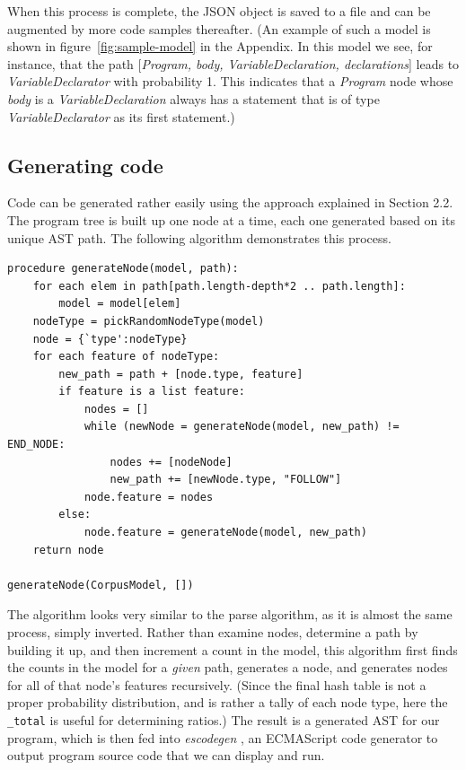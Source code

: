 \documentclass[titlepage]{article}
\begin{document}
When this process is complete, the JSON object is saved to a file and can be augmented by more code samples thereafter. (An example of such a model is shown in figure~\ref{fig:sample-model} in the Appendix. In this model we see, for instance, that the path
[\emph{Program, body, VariableDeclaration, declarations}] leads to
\emph{VariableDeclarator} with probability 1. This indicates that a \emph{Program}
node whose \emph{body} is a \emph{VariableDeclaration} always has a statement that is of
type \emph{VariableDeclarator} as its first statement.)

\subsection{Generating code}

Code can be generated rather easily using the approach explained in Section 2.2. The program tree is built up one node at a time, each one generated based on its unique AST path. The following algorithm demonstrates this process.

\clearpage

\begin{verbatim}
procedure generateNode(model, path):
    for each elem in path[path.length-depth*2 .. path.length]:
        model = model[elem]
    nodeType = pickRandomNodeType(model)
    node = {`type':nodeType}
    for each feature of nodeType:
        new_path = path + [node.type, feature]
        if feature is a list feature:
            nodes = []
            while (newNode = generateNode(model, new_path) != END_NODE:
                nodes += [nodeNode]
                new_path += [newNode.type, "FOLLOW"]
            node.feature = nodes
        else:
            node.feature = generateNode(model, new_path)
    return node

generateNode(CorpusModel, [])
\end{verbatim}

The algorithm looks very similar to the parse algorithm, as it is almost the same process, simply inverted. Rather than examine nodes, determine a path by building it up, and then increment a count in the model, this algorithm first finds the counts in the model for a \emph{given} path, generates a node, and generates nodes for all of that node's features recursively. (Since the final hash table is not a proper probability distribution, and is rather a tally of each node type, here the {\tt \_total} is useful for determining ratios.) The result is a generated AST for our program, which is then fed into \emph{escodegen} \cite{escodegen}, an ECMAScript code generator to output program source code that we can display and run.
\end{document}
